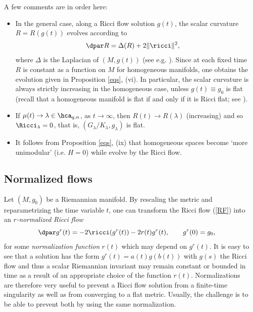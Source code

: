 \documentclass[11pt]{amsart}
\theoremstyle{plain}
\theoremstyle{definition}
\theoremstyle{remark}
\begin{document}
A few comments are in order here:

\begin{itemize}
\item In the general case, along a Ricci flow solution $g(t)$, the scalar curvature $R=R(g(t))$ evolves according to
$$
\dpar R=\Delta(R)+2\|\ricci\|^2,
$$
where $\Delta$ is the Laplacian of $(M,g(t))$ (see e.g. \cite[Lemma 6.7]{ChwKnp}).  Since at each fixed time $R$ is constant as a function on $M$ for homogeneous manifolds, one obtains the evolution given in Proposition \ref{eqs}, (vi).  In particular, the scalar curvature is always strictly increasing in the homogeneous case, unless $g(t)\equiv g_0$ is flat (recall that a homogeneous manifold is flat if and only if it is Ricci flat; see \cite{AlkKml}).

\item If $\mu(t)\to\lambda\in\hca_{q,n}$, as $t\to\infty$, then $R(t)\to R(\lambda)$ (increasing) and so $\Ricci_\lambda=0$, that is, $(G_\lambda/K_\lambda,g_\lambda)$ is flat.

\item It follows from Proposition \ref{eqs}, (ix) that homogeneous spaces become `more unimodular' (i.e. $H=0$) while evolve by the Ricci flow.
\end{itemize}













\subsection{Normalized flows}\label{norm}
Let $(M,g_0)$ be a Riemannian manifold.  By rescaling the metric and reparametrizing the time
variable $t$, one can transform the Ricci flow (\ref{RF}) into an {\it $r$-normalized Ricci flow}
\begin{equation}\label{RFrn}
\dpar g^r(t)=-2\ricci(g^r(t))-2r(t)g^r(t),\qquad g^r(0)=g_0,
\end{equation}
for some {\it normalization function} $r(t)$ which may depend on $g^r(t)$.  It is easy to see that a solution has the form $g^r(t)=a(t)g(b(t))$ with $g(s)$ the Ricci flow and thus a scalar Riemannian invariant may remain constant or bounded in time as a result of an appropriate choice of the function $r(t)$.  Normalizations are therefore very useful to prevent a Ricci flow solution from a finite-time singularity as well as from converging to a flat metric.  Usually, the challenge is to be able to prevent both by using the same normalization.
\end{document}
